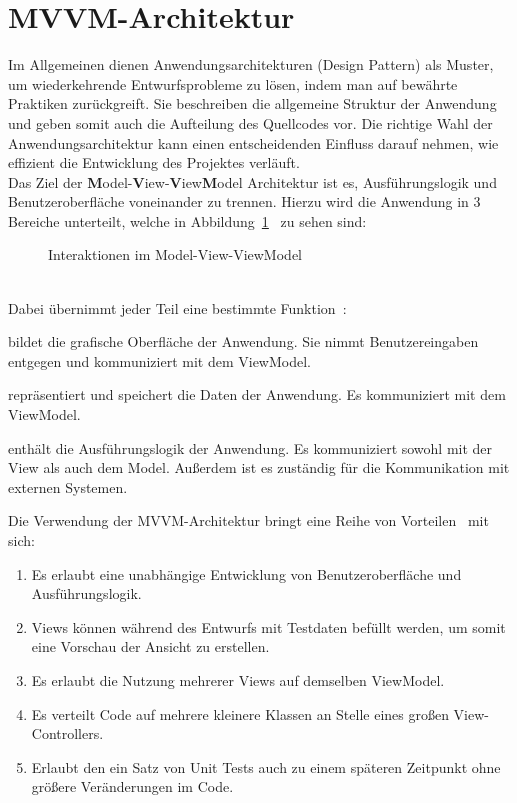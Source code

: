     \section{MVVM-Architektur}\label{sec:mvvm-architektur}
    Im Allgemeinen dienen Anwendungsarchitekturen (Design Pattern) als Muster, um wiederkehrende Entwurfsprobleme zu lösen, indem man auf bewährte Praktiken zurückgreift.
    Sie beschreiben die allgemeine Struktur der Anwendung und geben somit auch die Aufteilung des Quellcodes vor.
    Die richtige Wahl der Anwendungsarchitektur kann einen entscheidenden Einfluss darauf nehmen, wie effizient die Entwicklung des Projektes verläuft.\\
    Das Ziel der \textbf{M}odel-\textbf{V}iew-\textbf{V}iew\textbf{M}odel Architektur ist es, Ausführungslogik und Benutzeroberfläche voneinander zu trennen.
    Hierzu wird die Anwendung in 3 Bereiche unterteilt, welche in Abbildung~\ref{fig:mvvm}~\cite{Sun2017/01} zu sehen sind:\\
    \begin{figure}[h]
        \centering
        
        \caption{Interaktionen im Model-View-ViewModel}
        \label{fig:mvvm}
    \end{figure}\\
    Dabei übernimmt jeder Teil eine bestimmte Funktion~\cite{Mishra2017}:
    \begin{description}[leftmargin=!,labelwidth=3cm]
        \item [View] bildet die grafische Oberfläche der Anwendung. Sie nimmt Benutzereingaben entgegen und kommuniziert mit dem ViewModel.
        \item [Model] repräsentiert und speichert die Daten der Anwendung. Es kommuniziert mit dem ViewModel.
        \item [ViewModel] enthält die Ausführungslogik der Anwendung. Es kommuniziert sowohl mit der View als auch dem Model. Außerdem ist es zuständig für die Kommunikation mit externen Systemen.
    \end{description}
    Die Verwendung der MVVM-Architektur bringt eine Reihe von Vorteilen~\cite{Anderson2012,Mishra2017} mit sich:
    \begin{enumerate}[label={(\arabic*)}]
        \item Es erlaubt eine unabhängige Entwicklung von Benutzeroberfläche und Ausführungslogik.
        \item Views können während des Entwurfs mit Testdaten befüllt werden, um somit eine Vorschau der Ansicht zu erstellen.
        \item Es erlaubt die Nutzung mehrerer Views auf demselben ViewModel.
        \item Es verteilt Code auf mehrere kleinere Klassen an Stelle eines großen View-Controllers.
        \item Erlaubt den ein Satz von Unit Tests auch zu einem späteren Zeitpunkt ohne größere Veränderungen im Code.
    \end{enumerate}

